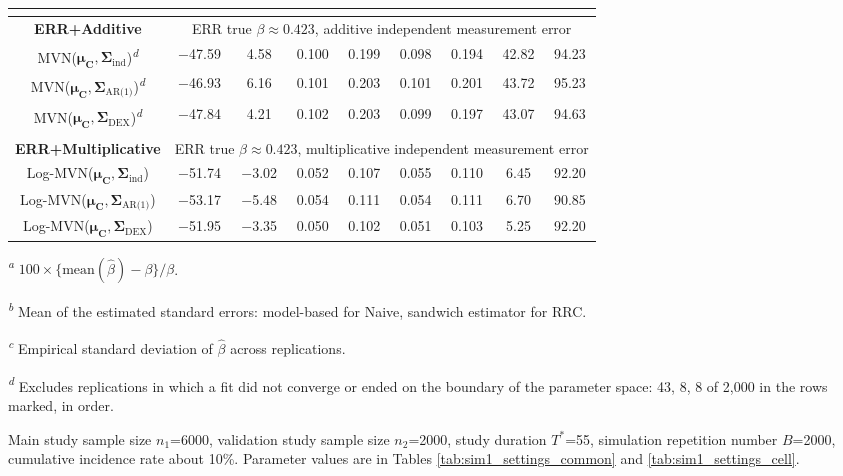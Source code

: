 \begin{table}[!htbp]
\begin{minipage}{\textwidth}
\begin{tabular}{|c|c|c|c|c|c|c|c|c|}
\hline
\multicolumn{9}{|c|}{}\\
\hline
\bf ERR+Additive & \multicolumn{8}{c|}{ERR true $\beta\approx 0.423$, additive independent measurement error} \\
\hline
MVN($\bm{\mu_C},\bm{\Sigma}_{\text{ind}}$)\textsuperscript{\textit{d}} & $-$47.59 & 4.58 & 0.100 & 0.199 & 0.098 & 0.194 & 42.82 & 94.23 \\
\hline
MVN($\bm{\mu_C},\bm{\Sigma}_{\text{AR(1)}}$)\textsuperscript{\textit{d}} & $-$46.93 & 6.16 & 0.101 & 0.203 & 0.101 & 0.201 & 43.72 & 95.23 \\
\hline
MVN($\bm{\mu_C},\bm{\Sigma}_{\text{DEX}}$)\textsuperscript{\textit{d}} & $-$47.84 & 4.21 & 0.102 & 0.203 & 0.099 & 0.197 & 43.07 & 94.63 \\
\hline
\multicolumn{9}{|c|}{}\\
\hline
\bf ERR+Multiplicative & \multicolumn{8}{c|}{ERR true $\beta\approx 0.423$, multiplicative independent measurement error} \\
\hline
Log-MVN($\bm{\mu_C},\bm{\Sigma}_{\text{ind}}$) & $-$51.74 & $-$3.02 & 0.052 & 0.107 & 0.055 & 0.110 & 6.45 & 92.20 \\
\hline
Log-MVN($\bm{\mu_C},\bm{\Sigma}_{\text{AR(1)}}$) & $-$53.17 & $-$5.48 & 0.054 & 0.111 & 0.054 & 0.111 & 6.70 & 90.85 \\
\hline
Log-MVN($\bm{\mu_C},\bm{\Sigma}_{\text{DEX}}$) & $-$51.95 & $-$3.35 & 0.050 & 0.102 & 0.051 & 0.103 & 5.25 & 92.20 \\
\hline
\end{tabular}
\par
{\raggedright\footnotesize
\begin{list}{}{\setlength{\leftmargin}{1.2em}\setlength{\labelwidth}{0.8em}\setlength{\labelsep}{0.4em}%
  \setlength{\itemsep}{0pt}\setlength{\parsep}{0pt}\setlength{\topsep}{4pt}\setlength{\partopsep}{0pt}}
\item[\textsuperscript{\textit{a}}] $100\times\{\text{mean}(\hat{\beta})-\beta\}/\beta$.
\item[\textsuperscript{\textit{b}}] Mean of the estimated standard errors: model-based for Naive, sandwich estimator for RRC.
\item[\textsuperscript{\textit{c}}] Empirical standard deviation of $\hat{\beta}$ across replications.
\item[\textsuperscript{\textit{d}}] Excludes replications in which a fit did not converge or ended on the boundary of the parameter space: 43, 8, 8 of 2,000 in the rows marked, in order.
\item[] Main study sample size $n_1$=6000, validation study sample size $n_2$=2000, study duration $T^{*}$=55, simulation repetition number $B$=2000, cumulative incidence rate about 10\%. Parameter values are in Tables \ref{tab:sim1_settings_common} and \ref{tab:sim1_settings_cell}.
\end{list}
\par}
\end{minipage}
\label{tab:sim1}
\end{table}
